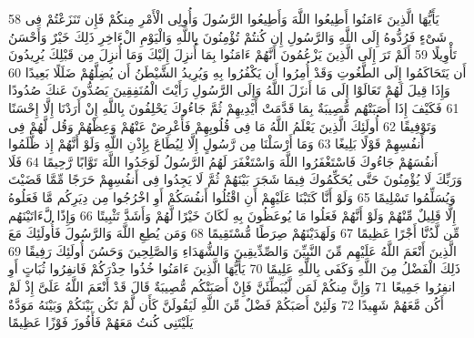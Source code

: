 {\tiny\colorbox{cl_aya}{58}} يَأَيُّهَا الَّذِينَ ءَامَنُوا أَطِيعُوا اللَّهَ وَأَطِيعُوا الرَّسُولَ وَأُولِى الْأَمْرِ مِنكُمْ فَإِن تَنَزَعْتُمْ فِى شَىْءٍ فَرُدُّوهُ إِلَى اللَّهِ وَالرَّسُولِ إِن كُنتُمْ تُؤْمِنُونَ بِاللَّهِ وَالْيَوْمِ الْءَاخِرِ ذَلِكَ خَيْرٌ وَأَحْسَنُ تَأْوِيلًا
{\tiny\colorbox{cl_aya}{59}} أَلَمْ تَرَ إِلَى الَّذِينَ يَزْعُمُونَ أَنَّهُمْ ءَامَنُوا بِمَا أُنزِلَ إِلَيْكَ وَمَا أُنزِلَ مِن قَبْلِكَ يُرِيدُونَ أَن يَتَحَاكَمُوا إِلَى الطَّغُوتِ وَقَدْ أُمِرُوا أَن يَكْفُرُوا بِهِ وَيُرِيدُ الشَّيْطَنُ أَن يُضِلَّهُمْ ضَلَلًا بَعِيدًا
{\tiny\colorbox{cl_aya}{60}} وَإِذَا قِيلَ لَهُمْ تَعَالَوْا إِلَى مَا أَنزَلَ اللَّهُ وَإِلَى الرَّسُولِ رَأَيْتَ الْمُنَفِقِينَ يَصُدُّونَ عَنكَ صُدُودًا
{\tiny\colorbox{cl_aya}{61}} فَكَيْفَ إِذَا أَصَبَتْهُم مُّصِيبَةٌ بِمَا قَدَّمَتْ أَيْدِيهِمْ ثُمَّ جَاءُوكَ يَحْلِفُونَ بِاللَّهِ إِنْ أَرَدْنَا إِلَّا إِحْسَنًا وَتَوْفِيقًا
{\tiny\colorbox{cl_aya}{62}} أُولَئِكَ الَّذِينَ يَعْلَمُ اللَّهُ مَا فِى قُلُوبِهِمْ فَأَعْرِضْ عَنْهُمْ وَعِظْهُمْ وَقُل لَّهُمْ فِى أَنفُسِهِمْ قَوْلًا بَلِيغًا
{\tiny\colorbox{cl_aya}{63}} وَمَا أَرْسَلْنَا مِن رَّسُولٍ إِلَّا لِيُطَاعَ بِإِذْنِ اللَّهِ وَلَوْ أَنَّهُمْ إِذ ظَّلَمُوا أَنفُسَهُمْ جَاءُوكَ فَاسْتَغْفَرُوا اللَّهَ وَاسْتَغْفَرَ لَهُمُ الرَّسُولُ لَوَجَدُوا اللَّهَ تَوَّابًا رَّحِيمًا
{\tiny\colorbox{cl_aya}{64}} فَلَا وَرَبِّكَ لَا يُؤْمِنُونَ حَتَّى يُحَكِّمُوكَ فِيمَا شَجَرَ بَيْنَهُمْ ثُمَّ لَا يَجِدُوا فِى أَنفُسِهِمْ حَرَجًا مِّمَّا قَضَيْتَ وَيُسَلِّمُوا تَسْلِيمًا
{\tiny\colorbox{cl_aya}{65}} وَلَوْ أَنَّا كَتَبْنَا عَلَيْهِمْ أَنِ اقْتُلُوا أَنفُسَكُمْ أَوِ اخْرُجُوا مِن دِيَرِكُم مَّا فَعَلُوهُ إِلَّا قَلِيلٌ مِّنْهُمْ وَلَوْ أَنَّهُمْ فَعَلُوا مَا يُوعَظُونَ بِهِ لَكَانَ خَيْرًا لَّهُمْ وَأَشَدَّ تَثْبِيتًا
{\tiny\colorbox{cl_aya}{66}} وَإِذًا لَّءَاتَيْنَهُم مِّن لَّدُنَّا أَجْرًا عَظِيمًا
{\tiny\colorbox{cl_aya}{67}} وَلَهَدَيْنَهُمْ صِرَطًا مُّسْتَقِيمًا
{\tiny\colorbox{cl_aya}{68}} وَمَن يُطِعِ اللَّهَ وَالرَّسُولَ فَأُولَئِكَ مَعَ الَّذِينَ أَنْعَمَ اللَّهُ عَلَيْهِم مِّنَ النَّبِيِّنَ وَالصِّدِّيقِينَ وَالشُّهَدَاءِ وَالصَّلِحِينَ وَحَسُنَ أُولَئِكَ رَفِيقًا
{\tiny\colorbox{cl_aya}{69}} ذَلِكَ الْفَضْلُ مِنَ اللَّهِ وَكَفَى بِاللَّهِ عَلِيمًا
{\tiny\colorbox{cl_aya}{70}} يَأَيُّهَا الَّذِينَ ءَامَنُوا خُذُوا حِذْرَكُمْ فَانفِرُوا ثُبَاتٍ أَوِ انفِرُوا جَمِيعًا
{\tiny\colorbox{cl_aya}{71}} وَإِنَّ مِنكُمْ لَمَن لَّيُبَطِّئَنَّ فَإِنْ أَصَبَتْكُم مُّصِيبَةٌ قَالَ قَدْ أَنْعَمَ اللَّهُ عَلَىَّ إِذْ لَمْ أَكُن مَّعَهُمْ شَهِيدًا
{\tiny\colorbox{cl_aya}{72}} وَلَئِنْ أَصَبَكُمْ فَضْلٌ مِّنَ اللَّهِ لَيَقُولَنَّ كَأَن لَّمْ تَكُن بَيْنَكُمْ وَبَيْنَهُ مَوَدَّةٌ يَلَيْتَنِى كُنتُ مَعَهُمْ فَأَفُوزَ فَوْزًا عَظِيمًا
